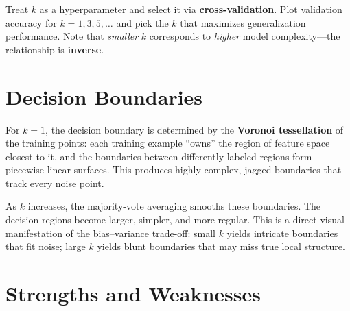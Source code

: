 \begin{remark}[Selecting $k$]
Treat $k$ as a hyperparameter and select it via \textbf{cross-validation}. Plot validation accuracy for $k = 1, 3, 5, \ldots$ and pick the $k$ that maximizes generalization performance. Note that \textit{smaller} $k$ corresponds to \textit{higher} model complexity---the relationship is \textbf{inverse}.
\end{remark}

\section*{Decision Boundaries}

For $k{=}1$, the decision boundary is determined by the \textbf{Voronoi tessellation} of the training points: each training example ``owns'' the region of feature space closest to it, and the boundaries between differently-labeled regions form piecewise-linear surfaces. This produces highly complex, jagged boundaries that track every noise point.

As $k$ increases, the majority-vote averaging smooths these boundaries. The decision regions become larger, simpler, and more regular. This is a direct visual manifestation of the bias--variance trade-off: small $k$ yields intricate boundaries that fit noise; large $k$ yields blunt boundaries that may miss true local structure.

\section*{Strengths and Weaknesses}

